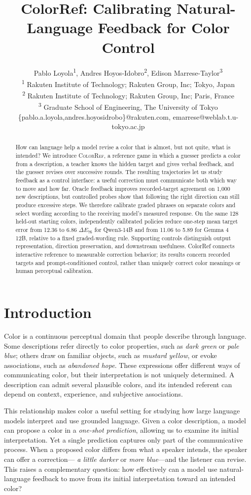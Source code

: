 \documentclass[11pt]{article}
\title{ColorRef: Calibrating Natural-Language Feedback for Color Control}
\author{Pablo Loyola\textsuperscript{1}, Andres Hoyos-Idobro\textsuperscript{2}, Edison Marrese-Taylor\textsuperscript{3} \\
\textsuperscript{1} Rakuten Institute of Technology; Rakuten Group, Inc; Tokyo, Japan\\
\textsuperscript{2} Rakuten Institute of Technology; Rakuten Group, Inc; Paris, France\\
\textsuperscript{3} Graduate School of Engineering, The University of Tokyo\\
\{pablo.a.loyola,andres.hoyosidrobo\}@rakuten.com, emarrese@weblab.t.u-tokyo.ac.jp}
\begin{document}
\maketitle

\begin{abstract}
How can language help a model revise a color that is almost, but not quite,
what is intended? We introduce \textsc{ColorRef}, a reference game in which
a guesser predicts a color from a description, a teacher knows the hidden
target and gives verbal feedback, and the guesser revises over successive
rounds. The resulting trajectories let us study feedback as a control
interface: a useful correction must communicate both which way to move and
how far. Oracle feedback improves recorded-target agreement on 1{,}000 new
descriptions, but controlled probes show that following the right direction
can still produce excessive steps. We therefore calibrate graded phrases
on separate colors and select wording according to the receiving model's
measured response. On the same 128 held-out starting colors, independently
calibrated policies reduce one-step mean target error from 12.36 to 6.86
$\Delta E_{76}$ for Qwen3-14B and from 11.06 to 5.89 for Gemma 4 12B,
relative to a fixed graded-wording rule. Supporting controls distinguish
output representation, direction preservation, and downstream usefulness.
ColorRef connects interactive reference to measurable correction behavior;
its results concern recorded targets and prompt-conditioned control, rather
than uniquely correct color meanings or human perceptual calibration.
\end{abstract}

\section{Introduction}
\label{sec:introduction}

Color is a continuous perceptual domain that people describe through
language. Some descriptions refer directly to color properties, such as
\textit{dark green} or \textit{pale blue}; others draw on familiar objects,
such as \textit{mustard yellow}, or evoke associations, such as
\textit{abandoned hope}. These expressions offer different ways of
communicating color, but their interpretation is not uniquely determined.
A description can admit several plausible colors, and its intended referent
can depend on context, experience, and subjective associations.

This relationship makes color a useful setting for studying how large
language models interpret and use grounded language. Given a color
description, a model can propose a color in a \emph{one-shot prediction},
allowing us to examine its initial interpretation. Yet a single prediction
captures only part of the communicative process. When a proposed color
differs from what a speaker intends, the speaker can offer a correction---
\textit{a little darker} or \textit{more blue}---and the listener can revise.
This raises a complementary question: how effectively can a model use
natural-language feedback to move from its initial interpretation toward
an intended color?
\end{document}
